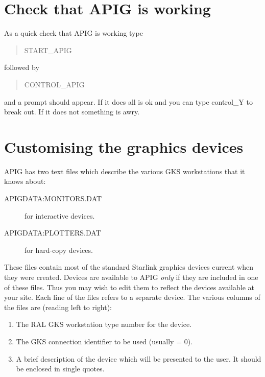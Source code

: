 \section{Check that APIG is working}

As a quick check that APIG is working type

\begin{verse}

START\_APIG

\end{verse}

followed by

\begin{verse}

CONTROL\_APIG

\end{verse}

and a prompt should appear. If it does all is ok and you can type 
control\_Y to break out. If it does not something is awry.

\section{Customising the graphics devices}

APIG has two text files which describe the various GKS workstations
that it knows about: 

\begin{description}

  \item[APIGDATA:MONITORS.DAT] for interactive devices.

  \item[APIGDATA:PLOTTERS.DAT] for hard-copy devices.

\end{description}

These files contain most of the standard Starlink graphics devices
current when they were created. Devices are available to APIG {\em
only} if they are included in one of these files. Thus you may wish to
edit them to reflect the devices available at your site. Each line of
the files refers to a separate device. The various columns of the
files are (reading left to right):

\begin{enumerate}

  \item The RAL GKS workstation type number for the device.

  \item The GKS connection identifier to be used (usually = 0).

  \item A brief description of the device which will be presented to
   the user. It should be enclosed in single quotes.

\end{enumerate}

